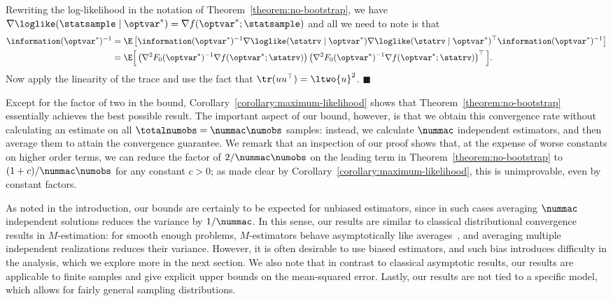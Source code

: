 \documentclass[11pt,twoside]{article}
\newcommand{\qed}{\hspace{\stretch{1}}
  $\blacksquare$
}
\renewenvironment{proof}{\noindent{\bf Proof}\hspace*{1em}}{\qed\\}
\theoremstyle{definition}
\begin{document}
%
\begin{proof}
  Rewriting the log-likelihood in the notation of
  Theorem~\ref{theorem:no-bootstrap}, we have $\nabla \loglike(\statsample
  \mid \optvar^*) = \nabla f(\optvar^*; \statsample)$ and
  all we need to note is that
  \begin{align*}
    \information(\optvar^*)^{-1}
    & = \E\left[\information(\optvar^*)^{-1}
      \nabla \loglike(\statrv \mid \optvar^*)
      \nabla \loglike(\statrv \mid \optvar^*)^\top \information(\optvar^*)^{-1}
      \right] \\
    & = \E\Big[\left(\nabla^2 F_0(\optvar^*)^{-1} \nabla f(\optvar^*;
      \statrv)\right)
      \left(\nabla^2 F_0(\optvar^*)^{-1} \nabla f(\optvar^*;
      \statrv)\right)^\top \Big].
  \end{align*}
  Now apply the linearity of the trace and use the fact that
  $\tr(uu^\top) = \ltwo{u}^2$.
\end{proof}

Except for the factor of two in the bound,
Corollary~\ref{corollary:maximum-likelihood} shows that
Theorem~\ref{theorem:no-bootstrap} essentially achieves the best
possible result. The important aspect of our bound, however, is that
we obtain this convergence rate without calculating an estimate on all
$\totalnumobs = \nummac \numobs$ samples: instead, we calculate
$\nummac$ independent estimators, and then average them to attain the
convergence guarantee. We remark that an inspection of our proof shows
that, at the expense of worse constants on higher order terms, we can
reduce the factor of $2 / \nummac \numobs$ on the leading term in
Theorem~\ref{theorem:no-bootstrap} to $(1 + c) / \nummac \numobs$ for
any constant $c > 0$; as made clear by
Corollary~\ref{corollary:maximum-likelihood}, this is
unimprovable, even by constant factors.

As noted in the introduction, our bounds are certainly to be expected
for unbiased estimators, since in such cases averaging $\nummac$
independent solutions reduces the variance by $1/\nummac$. In this
sense, our results are similar to classical distributional convergence
results in $M$-estimation: for smooth enough problems, $M$-estimators
behave asymptotically like averages~\citep{VanDerVaart98,LehmannCa98},
and averaging multiple independent realizations reduces their
variance.  However, it is often desirable to use biased estimators,
and such bias introduces difficulty in the analysis, which we explore
more in the next section.  We also note that in contrast to classical
asymptotic results, our results are applicable to finite samples and
give explicit upper bounds on the mean-squared error.  Lastly, our
results are not tied to a specific model, which allows for fairly
general sampling distributions.
\end{document}

